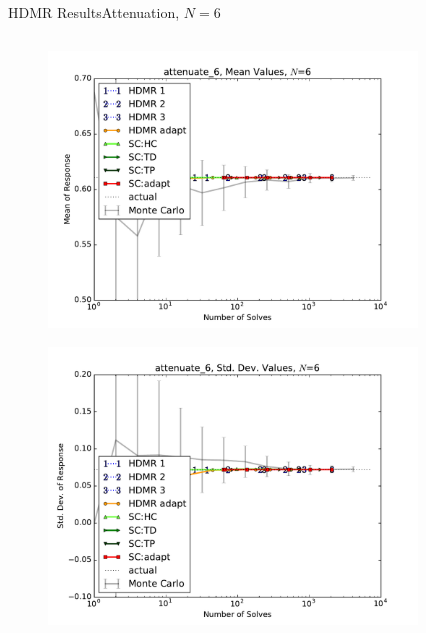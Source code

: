 \documentclass{beamer}
\begin{document}
\begin{frame}{HDMR Results}{Attenuation, $N=6$}\vspace{-20pt}
 \begin{columns}
   \begin{column}{0.5\textwidth}
        \begin{figure}[h!]
          \centering
          \includegraphics[width=0.8\linewidth]{anlmodels/attenuate_6_mean_vals}
        \end{figure}
        \vspace{-20pt}
        \begin{figure}[h!]
          \centering
          \includegraphics[width=0.8\linewidth]{anlmodels/attenuate_6_var_vals}
        \end{figure}
   \end{column}
   \begin{column}{0.5\textwidth}
        \begin{figure}[h!]
          \centering

\end{figure}
\end{column}
\end{columns}
\end{frame}
\end{document}
